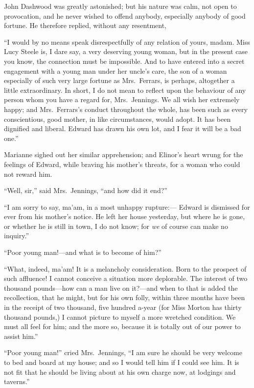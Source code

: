 John Dashwood was greatly astonished; but his nature
was calm, not open to provocation, and he never wished
to offend anybody, especially anybody of good fortune.
He therefore replied, without any resentment,

``I would by no means speak disrespectfully of any
relation of yours, madam.  Miss Lucy Steele is, I dare say,
a very deserving young woman, but in the present case
you know, the connection must be impossible.
And to have entered into a secret engagement with a
young man under her uncle's care, the son of a woman
especially of such very large fortune as Mrs.\ Ferrars,
is perhaps, altogether a little extraordinary. In short,
I do not mean to reflect upon the behaviour of any person
whom you have a regard for, Mrs.\ Jennings.  We all wish
her extremely happy; and Mrs.\ Ferrars's conduct throughout
the whole, has been such as every conscientious, good mother,
in like circumstances, would adopt.  It has been dignified
and liberal.  Edward has drawn his own lot, and I fear
it will be a bad one.''

Marianne sighed out her similar apprehension;
and Elinor's heart wrung for the feelings of Edward,
while braving his mother's threats, for a woman who could
not reward him.

``Well, sir,'' said Mrs.\ Jennings, ``and how did it end?''

``I am sorry to say, ma'am, in a most unhappy rupture:---%
Edward is dismissed for ever from his mother's notice.
He left her house yesterday, but where he is gone, or whether
he is still in town, I do not know; for \emph{we} of course can
make no inquiry.''

``Poor young man!---and what is to become of him?''

``What, indeed, ma'am!  It is a melancholy consideration.
Born to the prospect of such affluence!  I cannot conceive
a situation more deplorable.  The interest of two thousand
pounds---how can a man live on it?---and when to that is added
the recollection, that he might, but for his own folly,
within three months have been in the receipt of two
thousand, five hundred a-year (for Miss Morton has
thirty thousand pounds,) I cannot picture to myself
a more wretched condition.  We must all feel for him;
and the more so, because it is totally out of our power
to assist him.''

``Poor young man!'' cried Mrs.\ Jennings, ``I am sure
he should be very welcome to bed and board at my house;
and so I would tell him if I could see him.  It is not fit
that he should be living about at his own charge now,
at lodgings and taverns.''

